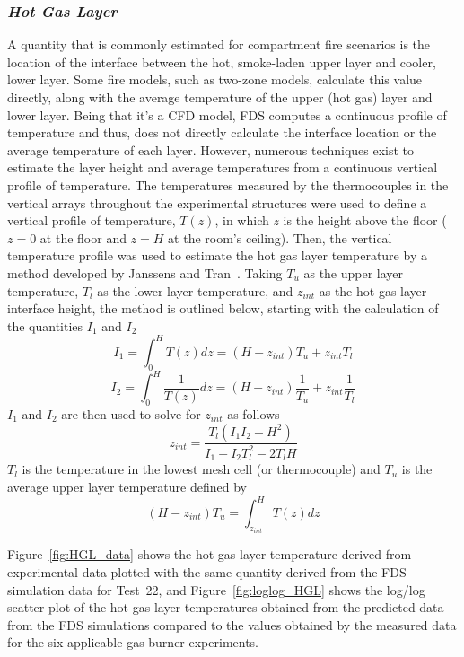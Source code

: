 \subsubsection*{\textit{Hot Gas Layer}}
A quantity that is commonly estimated for compartment fire scenarios is the location of the interface between the hot, smoke-laden upper layer and cooler, lower layer. Some fire models, such as two-zone models, calculate this value directly, along with the average temperature of the upper (hot gas) layer and lower layer. Being that it's a CFD model, FDS computes a continuous profile of temperature and thus, does not directly calculate the interface location or the average temperature of each layer. However, numerous techniques exist to estimate the layer height and average temperatures from a continuous vertical profile of temperature. The temperatures measured by the thermocouples in the vertical arrays throughout the experimental structures were used to define a vertical profile of temperature, $T(z)$, in which $z$ is the height above the floor ($z=0$ at the floor and $z=H$ at the room's ceiling). Then, the vertical temperature profile was used to estimate the hot gas layer temperature by a method developed by Janssens and Tran~\cite{Janssens:JFS1992}. Taking $T_u$ as the upper layer temperature, $T_l$ as the lower layer temperature, and $z_{int}$ as the hot gas layer interface height, the method is outlined below, starting with the calculation of the quantities $I_1$ and $I_2$
\begin{equation*}
	I_1 = \int^H_0 T(z)dz = (H-z_{int})T_u+z_{int}T_l
\end{equation*}
\begin{equation*}
	I_2 = \int^H_0 \frac{1}{T(z)}dz = (H-z_{int})\frac{1}{T_u}+z_{int}\frac{1}{T_l}
\end{equation*}
$I_1$ and $I_2$ are then used to solve for $z_{int}$ as follows
\begin{equation}
	z_{int}=\frac{T_l(I_1I_2-H^2)}{I_1+I_2 T_l^2-2T_l H}
\end{equation}
$T_l$ is the temperature in the lowest mesh cell (or thermocouple) and $T_u$ is the average upper layer temperature defined by
\begin{equation}
	(H-z_{int})T_u=\int^H_{z_{int}} T(z)dz
\end{equation}

Figure~\ref{fig:HGL_data} shows the hot gas layer temperature derived from experimental data plotted with the same quantity derived from the FDS simulation data for Test~22, and Figure~\ref{fig:loglog_HGL} shows the log/log scatter plot of the hot gas layer temperatures obtained from the predicted data from the FDS simulations compared to the values obtained by the measured data for the six applicable gas burner experiments. 

